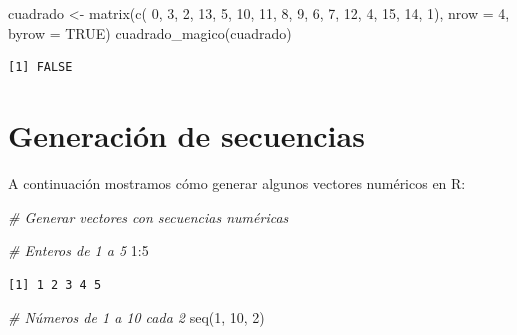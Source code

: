 \documentclass[
]{book}
\newenvironment{Shaded}{\begin{snugshade}}{\end{snugshade}}
\newcommand{\AttributeTok}[1]{\textcolor[rgb]{0.77,0.63,0.00}{#1}}
\newcommand{\CommentTok}[1]{\textcolor[rgb]{0.56,0.35,0.01}{\textit{#1}}}
\newcommand{\ConstantTok}[1]{\textcolor[rgb]{0.00,0.00,0.00}{#1}}
\newcommand{\DecValTok}[1]{\textcolor[rgb]{0.00,0.00,0.81}{#1}}
\newcommand{\FunctionTok}[1]{\textcolor[rgb]{0.00,0.00,0.00}{#1}}
\newcommand{\NormalTok}[1]{#1}
\newcommand{\OtherTok}[1]{\textcolor[rgb]{0.56,0.35,0.01}{#1}}
\newcommand{\SpecialCharTok}[1]{\textcolor[rgb]{0.00,0.00,0.00}{#1}}
\begin{document}
\begin{Shaded}
\begin{Highlighting}[]
\NormalTok{cuadrado }\OtherTok{\textless{}{-}} \FunctionTok{matrix}\NormalTok{(}\FunctionTok{c}\NormalTok{( }\DecValTok{0}\NormalTok{,  }\DecValTok{3}\NormalTok{,  }\DecValTok{2}\NormalTok{, }\DecValTok{13}\NormalTok{,}
                      \DecValTok{5}\NormalTok{, }\DecValTok{10}\NormalTok{, }\DecValTok{11}\NormalTok{,  }\DecValTok{8}\NormalTok{,}
                      \DecValTok{9}\NormalTok{,  }\DecValTok{6}\NormalTok{,  }\DecValTok{7}\NormalTok{, }\DecValTok{12}\NormalTok{,}
                      \DecValTok{4}\NormalTok{, }\DecValTok{15}\NormalTok{, }\DecValTok{14}\NormalTok{,  }\DecValTok{1}\NormalTok{), }\AttributeTok{nrow =} \DecValTok{4}\NormalTok{, }\AttributeTok{byrow =} \ConstantTok{TRUE}\NormalTok{)}
\FunctionTok{cuadrado\_magico}\NormalTok{(cuadrado)}
\end{Highlighting}
\end{Shaded}

\begin{verbatim}
[1] FALSE
\end{verbatim}

\hypertarget{generaciuxf3n-de-secuencias}{%
\section{Generación de secuencias}\label{generaciuxf3n-de-secuencias}}

A continuación mostramos cómo generar algunos vectores numéricos en R:

\begin{Shaded}
\begin{Highlighting}[]
\CommentTok{\# Generar vectores con secuencias numéricas}

\CommentTok{\# Enteros de 1 a 5}
\DecValTok{1}\SpecialCharTok{:}\DecValTok{5}
\end{Highlighting}
\end{Shaded}

\begin{verbatim}
[1] 1 2 3 4 5
\end{verbatim}

\begin{Shaded}
\begin{Highlighting}[]
\CommentTok{\# Números de 1 a 10 cada 2}
\FunctionTok{seq}\NormalTok{(}\DecValTok{1}\NormalTok{, }\DecValTok{10}\NormalTok{, }\DecValTok{2}\NormalTok{)}
\end{Highlighting}
\end{Shaded}
\end{document}
